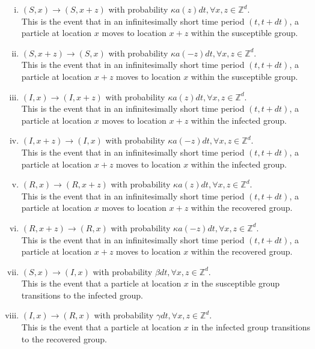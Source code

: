 \documentclass[sn-basic]{sn-jnl}%
\theoremstyle{thmstyleone}%
\theoremstyle{thmstyletwo}%
\theoremstyle{thmstylethree}%
\numberwithin{equation}{theorem}
\begin{document}
\begin{enumerate}[(i)]
\item $(S,x) \rightarrow (S,x+z)$ with probability $\kappa a(z)dt, \forall x,z \in \mathbb{Z}^{d}$.\\ %
This is the event that in an infinitesimally short time period $(t,t+dt)$, a particle at location $x$ moves to location $x+z$ within the susceptible group.\\
\item $(S,x+z) \rightarrow (S,x)$ with probability $\kappa a(-z)dt, \forall x,z \in \mathbb{Z}^{d}$.\\
This is the event that in an infinitesimally short time period $(t,t+dt)$, a particle at location $x+z$ moves to location $x$ within the susceptible group.\\
\item $(I,x) \rightarrow (I,x+z)$ with probability $\kappa a(z)dt, \forall x,z \in \mathbb{Z}^{d}$.\\
This is the event that in an infinitesimally short time period $(t,t+dt)$, a particle at location $x$ moves to location $x+z$ within the infected group.\\
\item $(I,x+z) \rightarrow (I,x)$ with probability $\kappa a(-z)dt, \forall x,z \in \mathbb{Z}^{d}$.\\
This is the event that in an infinitesimally short time period $(t,t+dt)$, a particle at location $x+z$ moves to location $x$ within the infected group.\\
\item $(R,x) \rightarrow (R,x+z)$ with probability $\kappa a(z)dt, \forall x,z \in \mathbb{Z}^{d}$.\\
This is the event that in an infinitesimally short time period $(t,t+dt)$, a particle at location $x$ moves to location $x+z$ within the recovered group.\\
\item $(R,x+z) \rightarrow (R,x)$ with probability $\kappa a(-z)dt, \forall x,z \in \mathbb{Z}^{d}$.\\
This is the event that in an infinitesimally short time period $(t,t+dt)$, a particle at location $x+z$ moves to location $x$ within the recovered group.\\
\item $(S,x) \rightarrow (I,x)$ with probability $\beta dt, \forall x,z \in \mathbb{Z}^{d}$.\\
This is the event that a particle at location $x$ in the susceptible group transitions to the infected group.\\
\item $(I,x) \rightarrow (R,x)$ with probability $\gamma dt, \forall x,z \in \mathbb{Z}^{d}$.\\
This is the event that a particle at location $x$ in the infected group transitions to the recovered group.
\end{enumerate}
\end{document}
